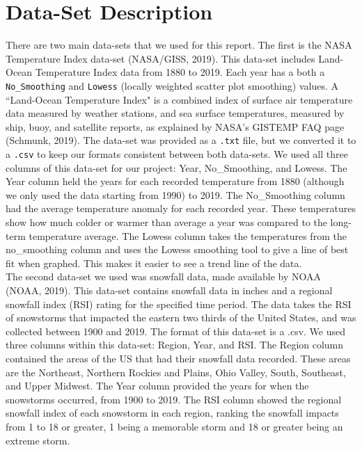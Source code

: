 \documentclass[fontsize=11pt]{article}
\begin{document}
\section*{Data-Set Description}

There are two main data-sets that we used for this report.
The first is the NASA Temperature Index data-set (NASA/GISS, 2019).
This data-set includes Land-Ocean Temperature Index data from 1880 to 2019.
Each year has a both a \texttt{No\_Smoothing} and \texttt{Lowess} (locally weighted scatter plot smoothing) values.
A ``Land-Ocean Temperature Index" is a combined index of surface air temperature data measured by weather stations, and sea surface temperatures, measured by ship, buoy, and satellite reports, as explained by NASA's GISTEMP FAQ page (Schmunk, 2019).
The data-set was provided as a \texttt{.txt} file, but we converted it to a \texttt{.csv} to keep our formats consistent between both data-sets. We used all three columns of this data-set for our project: Year, No\_Smoothing, and Lowess. The Year column held the years for each recorded temperature from 1880 (although we only used the data starting from 1990) to 2019. The No\_Smoothing column had the average temperature anomaly for each recorded year. These temperatures show how much colder or warmer than average a year was compared to the long-term temperature average. The Lowess column takes the temperatures from the no\_smoothing column and uses the Lowess smoothing tool to give a line of best fit when graphed. This makes it easier to see a trend line of the data. \\

The second data-set we used was snowfall data, made available by NOAA (NOAA, 2019).
This data-set contains snowfall data in inches and a regional snowfall index (RSI) rating for the specified time period. The data takes the RSI of snowstorms that impacted the eastern two thirds of the United States, and was collected between 1900 and 2019. The format of this data-set is a .csv. We used three columns within this data-set: Region, Year, and RSI. The Region column contained the areas of the US that had their snowfall data recorded. These areas are the Northeast, Northern Rockies and Plains, Ohio Valley, South, Southeast, and Upper Midwest. The Year column provided the years for when the snowstorms occurred, from 1900 to 2019. The RSI column showed the regional snowfall index of each snowstorm in each region, ranking the snowfall impacts from 1 to 18 or greater, 1 being a memorable storm and 18 or greater being an extreme storm. 
\end{document}
